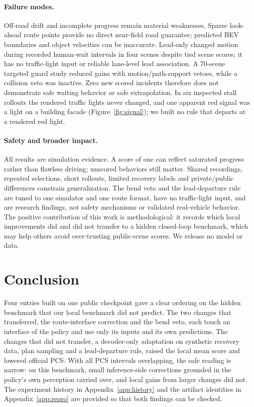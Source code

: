 \documentclass{article}
\begin{document}
\paragraph{Failure modes.}
Off-road drift and incomplete progress remain material weaknesses. Sparse look-ahead route points provide no direct near-field road guarantee; predicted BEV boundaries and object velocities can be inaccurate. Lead-only changed motion during recorded human-wait intervals in four scenes despite tied scene scores; it has no traffic-light input or reliable lane-level lead association. A 70-scene targeted guard study reduced gains with motion/path-support vetoes, while a collision veto was inactive. Zero new scored incidents therefore does not demonstrate safe waiting behavior or safe extrapolation. In six inspected stall rollouts the rendered traffic lights never changed, and one apparent red signal was a light on a building facade (Figure~\ref{fig:signal}); we built no rule that departs at a rendered red light.

\paragraph{Safety and broader impact.}
All results are simulation evidence. A score of one can reflect saturated progress rather than flawless driving; unscored behaviors still matter. Shared recordings, repeated selections, short rollouts, limited recovery labels and private/public differences constrain generalization. The bend veto and the lead-departure rule are tuned to one simulator and one route format, have no traffic-light input, and are research findings, not safety mechanisms or validated real-vehicle behavior. The positive contribution of this work is methodological: it records which local improvements did and did not transfer to a hidden closed-loop benchmark, which may help others avoid over-trusting public-scene scores. We release no model or data.

\section{Conclusion}
Four entries built on one public checkpoint gave a clear ordering on the hidden benchmark that our local benchmark did not predict. The two changes that transferred, the route-interface correction and the bend veto, each touch an interface of the policy and use only its inputs and its own predictions. The changes that did not transfer, a decoder-only adaptation on synthetic recovery data, plan sampling and a lead-departure rule, raised the local mean score and lowered official PCS. With all PCS intervals overlapping, the safe reading is narrow: on this benchmark, small inference-side corrections grounded in the policy's own perception carried over, and local gains from larger changes did not. The experiment history in Appendix~\ref{app:history} and the artifact identities in Appendix~\ref{app:repro} are provided so that both findings can be checked.
\end{document}

